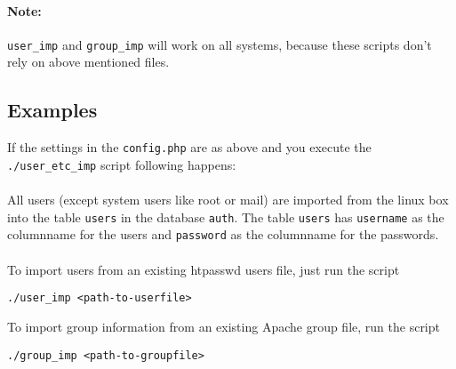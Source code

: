 \paragraph{Note:}{{\tt user\_imp} and {\tt group\_imp} will work on all systems, because these scripts don't rely on above mentioned files.}
\subsection{Examples}
If the settings in the {\tt config.php} are as above and you execute the {\tt ./user\_etc\_imp} script following happens:\\
\\
All users (except system users like root or mail) are imported from the linux box into the table {\tt users} in the database {\tt auth}.
The table {\tt users} has {\tt username} as the columnname for the users and {\tt password} as the columnname for the passwords.\\
\\
To import users from an existing htpasswd users file, just run the script
\begin{verbatim}
./user_imp <path-to-userfile>
\end{verbatim}
To import group information from an existing Apache group file, run the script
\begin{verbatim}
./group_imp <path-to-groupfile>
\end{verbatim}

